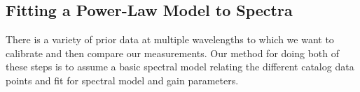 \documentclass[preprint]{aastex}
\begin{document}



\subsection{Fitting a Power-Law Model to Spectra}
\label{sec:mcmc}

There is a variety of prior data at multiple wavelengths to which we want to calibrate
and then compare our measurements.  Our method for doing both of these steps
is to assume a basic spectral model relating the different catalog data points and
fit for spectral model and gain parameters. 
\end{document}
